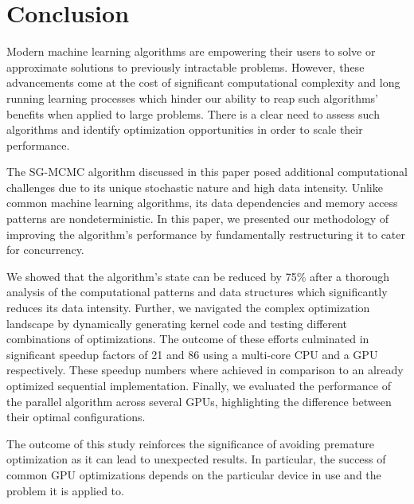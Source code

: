 \section{Conclusion}
Modern machine learning algorithms are empowering their
users to solve or approximate solutions to previously intractable problems.
However, these advancements come at the cost of significant computational
complexity and long running learning processes which hinder our ability to reap
such algorithms' benefits when applied to large problems. There is a clear need
to assess such algorithms and identify optimization opportunities in order to
scale their performance.

The SG-MCMC algorithm discussed in this paper posed additional computational
challenges due to its unique stochastic nature and high data intensity. Unlike
common machine learning algorithms, its data dependencies and memory access
patterns are nondeterministic. In this paper, we presented our methodology of
improving the algorithm's performance by fundamentally restructuring it to
cater for concurrency.

We showed that the algorithm's state can be reduced by 75\% after a thorough
analysis of the computational patterns and data structures which significantly
reduces its data intensity. Further, we navigated the complex optimization
landscape by dynamically generating kernel code and testing different
combinations of optimizations. The outcome of these efforts culminated in
significant speedup factors of 21 and 86 using a multi-core CPU and a GPU
respectively. These speedup numbers where achieved in comparison to an already
optimized sequential implementation. Finally, we evaluated the performance of
the parallel algorithm across several GPUs, highlighting the difference between
their optimal configurations.

The outcome of this study reinforces the significance of avoiding premature
optimization as it can lead to unexpected results. In particular, the success
of common GPU optimizations depends on the particular device in use and the
problem it is applied to.
